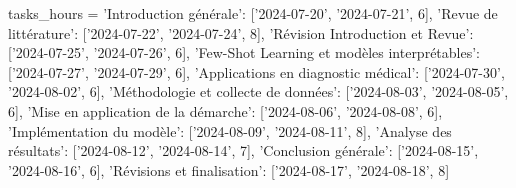tasks_hours = {
    'Introduction générale': ['2024-07-20', '2024-07-21', 6],
    'Revue de littérature': ['2024-07-22', '2024-07-24', 8],
    'Révision Introduction et Revue': ['2024-07-25', '2024-07-26', 6],
    'Few-Shot Learning et modèles interprétables': ['2024-07-27', '2024-07-29', 6],
    'Applications en diagnostic médical': ['2024-07-30', '2024-08-02', 6],
    'Méthodologie et collecte de données': ['2024-08-03', '2024-08-05', 6],
    'Mise en application de la démarche': ['2024-08-06', '2024-08-08', 6],
    'Implémentation du modèle': ['2024-08-09', '2024-08-11', 8],
    'Analyse des résultats': ['2024-08-12', '2024-08-14', 7],
    'Conclusion générale': ['2024-08-15', '2024-08-16', 6],
    'Révisions et finalisation': ['2024-08-17', '2024-08-18', 8]
}